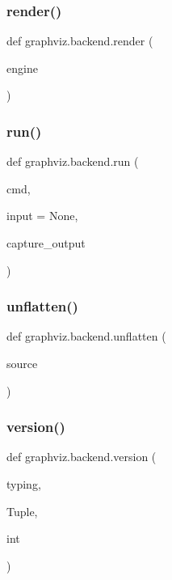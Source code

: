 \subsubsection{\texorpdfstring{render()}{render()}}
{\footnotesize\ttfamily def graphviz.\+backend.\+render (\begin{DoxyParamCaption}\item[{}]{engine }\end{DoxyParamCaption})}

\mbox{\label{namespacegraphviz_1_1backend_ad0353ed739611eea5924f8af4b3a3618}} 
\subsubsection{\texorpdfstring{run()}{run()}}
{\footnotesize\ttfamily def graphviz.\+backend.\+run (\begin{DoxyParamCaption}\item[{}]{cmd,  }\item[{}]{input = {\ttfamily None},  }\item[{}]{capture\+\_\+output }\end{DoxyParamCaption})}

\mbox{\label{namespacegraphviz_1_1backend_ae10adeb73d6d33c09857d5b5e0fb0ede}} 
\subsubsection{\texorpdfstring{unflatten()}{unflatten()}}
{\footnotesize\ttfamily def graphviz.\+backend.\+unflatten (\begin{DoxyParamCaption}\item[{}]{source }\end{DoxyParamCaption})}

\mbox{\label{namespacegraphviz_1_1backend_ac098062fcef1b6bb74f4a4fff2f064bf}} 
\subsubsection{\texorpdfstring{version()}{version()}}
{\footnotesize\ttfamily def graphviz.\+backend.\+version (\begin{DoxyParamCaption}\item[{}]{typing,  }\item[{}]{Tuple,  }\item[{}]{int }\end{DoxyParamCaption})}

